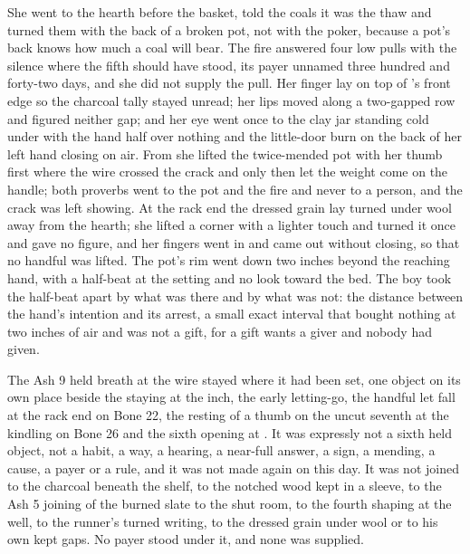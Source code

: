 She went to the hearth before the basket, told the coals it was the thaw and turned them with the back of a broken pot, not with the poker, because a pot's back knows how much a coal will bear. The fire answered four low pulls with the silence where the fifth should have stood, its payer unnamed three hundred and forty-two days, and she did not supply the pull. Her finger lay on top of 's front edge so the charcoal tally stayed unread; her lips moved along a two-gapped row and figured neither gap; and her eye went once to the clay jar standing cold under  with the hand half over nothing and the little-door burn on the back of her left hand closing on air. From  she lifted the twice-mended pot with her thumb first where the wire crossed the crack and only then let the weight come on the handle; both proverbs went to the pot and the fire and never to a person, and the crack was left showing. At the rack end the dressed grain lay turned under wool away from the hearth; she lifted a corner with a lighter touch and turned it once and gave no figure, and her fingers went in and came out without closing, so that no handful was lifted. The pot's rim went down two inches beyond the reaching hand, with a half-beat at the setting and no look toward the bed. The boy took the half-beat apart by what was there and by what was not: the distance between the hand's intention and its arrest, a small exact interval that bought nothing at two inches of air and was not a gift, for a gift wants a giver and nobody had given.

The Ash 9 held breath at the wire stayed where it had been set, one object on its own place beside the staying at the inch, the early letting-go, the handful let fall at the rack end on Bone 22, the resting of a thumb on the uncut seventh at the kindling on Bone 26 and the sixth opening at . It was expressly not a sixth held object, not a habit, a way, a hearing, a near-full answer, a sign, a mending, a cause, a payer or a rule, and it was not made again on this day. It was not joined to the charcoal beneath the shelf, to the notched wood kept in a sleeve, to the Ash 5 joining of the burned slate to the shut room, to the fourth shaping at the well, to the runner's turned writing, to the dressed grain under wool or to his own kept gaps. No payer stood under it, and none was supplied.

